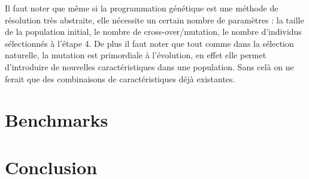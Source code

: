 \documentclass{report}
\begin{document}
Il faut noter que même si la programmation génétique est une méthode
de résolution très abstraite, elle nécessite un certain nombre de
paramètres : la taille de la population initial, le nombre de
cross-over/mutation, le nombre d'individus sélectionnés à l'étape 4.
De plus il faut noter que tout comme dans la sélection naturelle, la
mutation est primordiale à l'évolution, en effet elle permet
d'introduire de nouvelles caractéristiques dans une population. Sans
celà on ne ferait que des combinaisons de caractéristiques déjà
existantes.

\chapter{Benchmarks}

\chapter{Conclusion}
\end{document}
